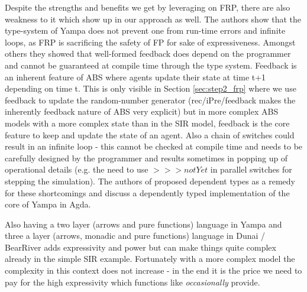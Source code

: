 Despite the strengths and benefits we get by leveraging on FRP, there are also weakness to it which show up in our approach as well. The authors \cite{sculthorpe_safe_2009} show that the type-system of Yampa does not prevent one from run-time errors and infinite loops, as FRP is sacrificing the safety of FP for sake of expressiveness. Amongst others they showed that well-formed feedback does depend on the programmer and cannot be guaranteed at compile time through the type system. Feedback is an inherent feature of ABS where agents update their state at time t+1 depending on time t. This is only visible in Section \ref{sec:step2_frp} where we use feedback to update the random-number generator (rec/iPre/feedback makes the inherently feedback nature of ABS very explicit) but in more complex ABS models with a more complex state than in the SIR model, feedback is the core feature to keep and update the state of an agent. Also a chain of switches could result in an infinite loop - this cannot be checked at compile time and needs to be carefully designed by the programmer and results sometimes in popping up of operational details (e.g. the need to use $>>> notYet$ in parallel switches for stepping the simulation). The authors of \cite{sculthorpe_safe_2009} proposed dependent types as a remedy for these shortcomings and discuss a dependently typed implementation of the core of Yampa in Agda.

Also having a two layer (arrows and pure functions) language in Yampa \cite{jeffrey_causality_2013} and three a layer (arrows, monadic and pure functions) language in Dunai / BearRiver adds expressivity and power but can make things quite complex already in the simple SIR example. Fortunately with a more complex model the complexity in this context does not increase - in the end it is the price we need to pay for the high expressivity which functions like \textit{occasionally} provide.

